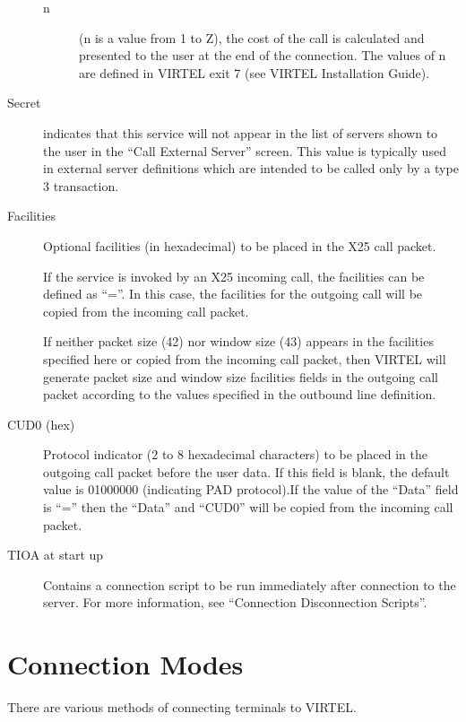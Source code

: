 \documentclass[letterpaper,10pt,english]{sphinxmanual}
\begin{document}
\begin{description}
\begin{description}
\item[{n}] \leavevmode
(n is a value from 1 to Z), the cost of the call is calculated and presented to the user at the end of the connection. The values of n are defined in VIRTEL exit 7 (see VIRTEL Installation Guide).

\end{description}

\item[{Secret}]  indicates that this service will not appear in the list of servers shown to the user in the “Call External Server” screen. This value is typically used in external server definitions which are intended to be called only by a type 3 transaction.

\item[{Facilities}] \leavevmode
Optional facilities (in hexadecimal) to be placed in the X25 call packet.

If the service is invoked by an X25 incoming call, the facilities can be defined as “=”. In this case, the facilities for the outgoing call will be copied from the incoming call packet.

If neither packet size (42) nor window size (43) appears in the facilities specified here or copied from the incoming call packet, then VIRTEL will generate packet size and window size facilities fields in the outgoing call packet according to the values specified in the outbound line definition.

\item[{CUD0 (hex)}] \leavevmode
Protocol indicator (2 to 8 hexadecimal characters) to be placed in the outgoing call packet before the user data. If this field is blank, the default value is 01000000 (indicating PAD protocol).If the value of the “Data” field is “=” then the “Data” and “CUD0” will be copied from the incoming call packet.

\item[{TIOA at start up}] \leavevmode
Contains a connection script to be run immediately after connection to the server. For more information, see “Connection \textendash{} Disconnection Scripts”.

\end{description}


\chapter{Connection Modes}
\label{\detokenize{connectivity_guide:connection-modes}}
There are various methods of connecting terminals to VIRTEL.
\end{document}
